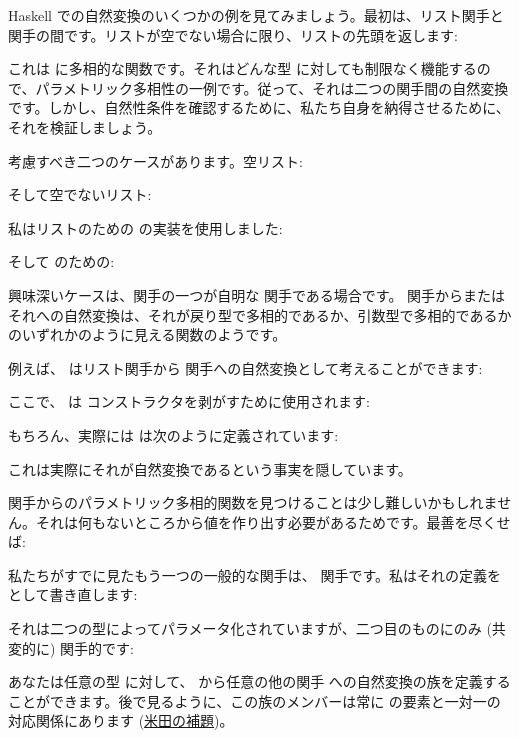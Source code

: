 Haskell での自然変換のいくつかの例を見てみましょう。最初は、リスト関手と  関手の間です。リストが空でない場合に限り、リストの先頭を返します: 

これは  に多相的な関数です。それはどんな型  に対しても制限なく機能するので、パラメトリック多相性の一例です。従って、それは二つの関手間の自然変換です。しかし、自然性条件を確認するために、私たち自身を納得させるために、それを検証しましょう。

考慮すべき二つのケースがあります。空リスト: 


そして空でないリスト: 


私はリストのための  の実装を使用しました: 

そして  のための: 

興味深いケースは、関手の一つが自明な  関手である場合です。  関手からまたはそれへの自然変換は、それが戻り型で多相的であるか、引数型で多相的であるかのいずれかのように見える関数のようです。

例えば、 はリスト関手から  関手への自然変換として考えることができます: 

ここで、 は  コンストラクタを剥がすために使用されます: 

もちろん、実際には  は次のように定義されています: 

これは実際にそれが自然変換であるという事実を隠しています。

 関手からのパラメトリック多相的関数を見つけることは少し難しいかもしれません。それは何もないところから値を作り出す必要があるためです。最善を尽くせば: 

私たちがすでに見たもう一つの一般的な関手は、 関手です。私はそれの定義をとして書き直します: 

それは二つの型によってパラメータ化されていますが、二つ目のものにのみ (共変的に) 関手的です: 

あなたは任意の型  に対して、 から任意の他の関手  への自然変換の族を定義することができます。後で見るように、この族のメンバーは常に  の要素と一対一の対応関係にあります (\hyperref[the-yoneda-lemma]{米田の補題})。

